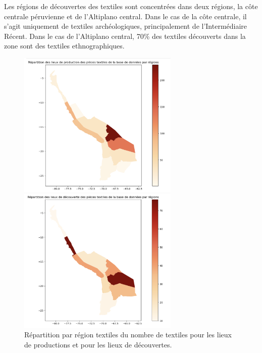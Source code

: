 Les régions de découvertes des textiles sont concentrées dans deux régions, la côte centrale péruvienne et de l'Altiplano central. Dans le cas de la côte centrale, il s'agit uniquement de textiles archéologiques, principalement de l'Intermédiaire Récent. Dans le cas de l'Altiplano central, 70\% des textiles \og découverts \fg \:dans la zone sont des textiles ethnographiques.

\begin{figure}[!h]
    \begin{minipage}[c]{.5\linewidth}
            \begin{center}
                \includegraphics[height=7cm]{../images/geo_region_prod.png}
            \end{center}
    \end{minipage}
        \begin{minipage}[c]{.5\linewidth}
        \begin{center}
        		\includegraphics[height=7cm]{../images/geo_region_find.png}
	\end{center}
    \end{minipage}
    \caption{Répartition par région textiles du nombre de textiles pour les lieux de productions et pour les lieux de découvertes.}
    \label{fig:geo_count_region}   
\end{figure}

